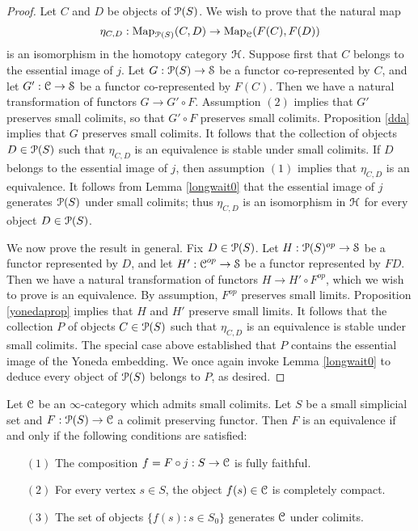 \begin{proof}
Let $C$ and $D$ be objects of $\operatorname{\mathcal{P}}(S)$. We wish to prove that the natural map
$$ \eta_{C,D}: \operatorname{{Map}}_{\operatorname{\mathcal{P}}(S)}(C,D) \rightarrow \operatorname{{Map}}_{\operatorname{\mathcal{C}}}(F(C), F(D))$$ is an isomorphism in the homotopy category $\operatorname{\mathcal{H}}$.
Suppose first that $C$ belongs to the essential image
of $j$. Let $G: \operatorname{\mathcal{P}}(S) \rightarrow \operatorname{\mathcal{S}}$ be a functor co-represented by $C$, and let
$G': \operatorname{\mathcal{C}} \rightarrow \operatorname{\mathcal{S}}$ be a functor co-represented by $F(C)$. Then we have a natural transformation of functors $G \rightarrow G' \circ F$. Assumption $(2)$ implies that $G'$ preserves small colimits, so that $G' \circ F$ preserves small colimits. Proposition \ref{dda} implies that
$G$ preserves small colimits. It follows that the collection of objects $D \in \operatorname{\mathcal{P}}(S)$ such
that $\eta_{C,D}$ is an equivalence is stable under small colimits. If $D$ belongs to the essential image of $j$, then assumption $(1)$ implies that $\eta_{C,D}$ is an equivalence. It follows from Lemma \ref{longwait0} that the essential image of $j$ generates $\operatorname{\mathcal{P}}(S)$ under small colimits; thus $\eta_{C,D}$ is an isomorphism in $\operatorname{\mathcal{H}}$ for every object $D \in \operatorname{\mathcal{P}}(S)$.

We now prove the result in general. Fix $D \in \operatorname{\mathcal{P}}(S)$. Let $H: \operatorname{\mathcal{P}}(S)^{op} \rightarrow \operatorname{\mathcal{S}}$
be a functor represented by $D$, and let $H': \operatorname{\mathcal{C}}^{op} \rightarrow \operatorname{\mathcal{S}}$ be a functor represented by $FD$. Then we have a natural transformation of functors $H \rightarrow H' \circ F^{op}$, which we wish to prove is an equivalence. By assumption, $F^{op}$ preserves small limits. Proposition \ref{yonedaprop} implies that $H$ and $H'$ preserve small limits. It follows that the collection $P$ of objects $C \in \operatorname{\mathcal{P}}(S)$ such that $\eta_{C,D}$ is an equivalence is stable under small colimits.
The special case above established that $P$ contains the essential image of the Yoneda embedding. We once again invoke Lemma \ref{longwait0} to deduce every object of $\operatorname{\mathcal{P}}(S)$ belongs to $P$, as desired.
\end{proof}

\begin{corollary}\label{charpr}
Let $\operatorname{\mathcal{C}}$ be an $\infty$-category which admits small colimits. Let $S$ be a small
simplicial set and $F: \operatorname{\mathcal{P}}(S) \rightarrow \operatorname{\mathcal{C}}$ a colimit preserving functor. Then
$F$ is an equivalence if and only if the following conditions are satisfied:
\begin{itemize}
\item[$(1)$] The composition $f =F \circ j: S \rightarrow \operatorname{\mathcal{C}}$ is fully faithful.
\item[$(2)$] For every vertex $s \in S$, the object $f(s) \in \operatorname{\mathcal{C}}$ is completely compact.
\item[$(3)$] The set of objects $\{ f(s): s \in S_0\}$ generates $\operatorname{\mathcal{C}}$ under colimits.
\end{itemize}
\end{corollary}

